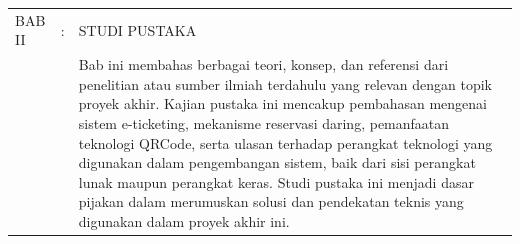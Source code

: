 \begin{longtable}{@{}llp{11cm}@{}}
    BAB II         & : & STUDI PUSTAKA                                                                                                                                                                                                                                                                                                                                                                                                                                                                                                                                                                                                                                                                                                                                                                                  \\
                   &   & Bab ini membahas berbagai teori, konsep, dan referensi dari penelitian atau sumber ilmiah terdahulu yang relevan dengan topik proyek akhir. Kajian pustaka ini mencakup pembahasan mengenai sistem e-ticketing, mekanisme reservasi daring, pemanfaatan teknologi QRCode, serta ulasan terhadap perangkat teknologi yang digunakan dalam pengembangan sistem, baik dari sisi perangkat lunak maupun perangkat keras. Studi pustaka ini menjadi dasar pijakan dalam merumuskan solusi dan pendekatan teknis yang digunakan dalam proyek akhir ini.                                                                                                                                                                                                                                              \\[0.8em]


\end{longtable}
